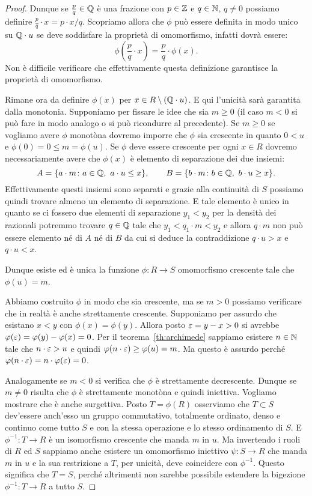 \begin{proof}
Dunque se $\frac{p}{q}\in{\mathbb Q}$ è una frazione con $p\in {\mathbb Z}$ e $q\in {\mathbb N}$, $q\neq 0$ 
possiamo definire $\frac{p}{q}\cdot x = p\cdot x/q$.
Scopriamo allora che $\phi$ può essere definita in modo unico su ${\mathbb Q}\cdot u$ 
se deve soddisfare la proprietà di omomorfismo, 
infatti dovrà essere:
\[
  \phi(\frac{p}{q}\cdot x) = \frac{p}{q}\cdot \phi(x).
\]
Non è difficile verificare che effettivamente questa definizione garantisce la 
proprietà di omomorfismo.

Rimane ora da definire $\phi(x)$ per $x\in R \setminus ({\mathbb Q}\cdot u)$.
E qui l'unicità sarà garantita dalla monotonia. 
Supponiamo per fissare le idee che sia $m\ge 0$
(il caso $m<0$ si può fare in modo analogo o si può ricondurre al precedente).
Se $m\ge 0$ se vogliamo avere $\phi$ monotòna dovremo imporre che 
$\phi$ sia crescente in quanto $0<u$ e $\phi(0) = 0 \le m = \phi(u)$. 
Se $\phi$ deve essere crescente per ogni $x\in R$
dovremo necessariamente avere che $\phi(x)$ è elemento di separazione 
dei due insiemi:
\[
A = {\left\{ a\cdot m\colon a\in {\mathbb Q},\ a\cdot u \le x  \right\}},\qquad
B = {\left\{ b\cdot m\colon b\in {\mathbb Q},\ b\cdot u \ge x \right\}}.
\]
Effettivamente questi insiemi sono separati e grazie alla continuità di $S$ 
possiamo quindi trovare almeno un elemento di separazione. 
E tale elemento è unico in quanto se ci fossero due elementi di separazione 
$y_1<y_2$ per la densità dei razionali potremmo trovare $q \in {\mathbb Q}$
tale che $y_1 < q_1\cdot m < y_2$ e allora $q\cdot m$ non può essere elemento 
né di $A$ né di $B$ da cui si deduce la contraddizione 
$q\cdot u >x$ e $q\cdot u < x$.

Dunque esiste ed è unica la funzione $\phi\colon R \to S$ 
omomorfismo crescente tale che $\phi(u)=m$.

Abbiamo costruito $\phi$ in modo che sia crescente, 
ma se $m>0$ possiamo verificare che in realtà è anche strettamente crescente. 
Supponiamo per assurdo che esistano $x<y$ con $\phi(x)=\phi(y)$.
Allora posto $\varepsilon=y-x>0$ si avrebbe $\varphi(\varepsilon) = \varphi(y)-\varphi(x) = 0$. 
Per il teorema~\ref{th:archimede}
sappiamo esistere $n\in {\mathbb N}$ tale che $n\cdot \varepsilon > u$
e quindi $\varphi(n\cdot \varepsilon) \ge \varphi(u) = m$.
Ma questo è assurdo perché $\varphi(n\cdot \varepsilon) = n\cdot \varphi(\varepsilon)=0$.

Analogamente se $m<0$ si verifica che $\phi$ è strettamente decrescente.
Dunque se $m\neq 0$ risulta che $\phi$ è strettamente monotòna e quindi 
iniettiva.
Vogliamo mostrare che è anche surgettiva. 
Posto $T=\phi(R)$ osserviamo che $T\subset S$ dev'essere anch'esso 
un gruppo commutativo, totalmente ordinato, denso e continuo come tutto $S$
e con la stessa operazione e lo stesso ordinamento di $S$.
E $\phi^{-1}\colon T\to R$ è un isomorfismo crescente che manda $m$ in $u$.
Ma invertendo i ruoli di $R$ ed $S$ sappiamo anche esistere un omomorfismo 
iniettivo $\psi\colon S\to R$ che manda $m$ in $u$ e la sua 
restrizione a $T$, per unicità, deve coincidere con $\phi^{-1}$.
Questo significa che $T=S$, perché altrimenti non sarebbe possibile 
estendere la bigezione $\phi^{-1}\colon T \to R$ a tutto $S$.
\end{proof}

